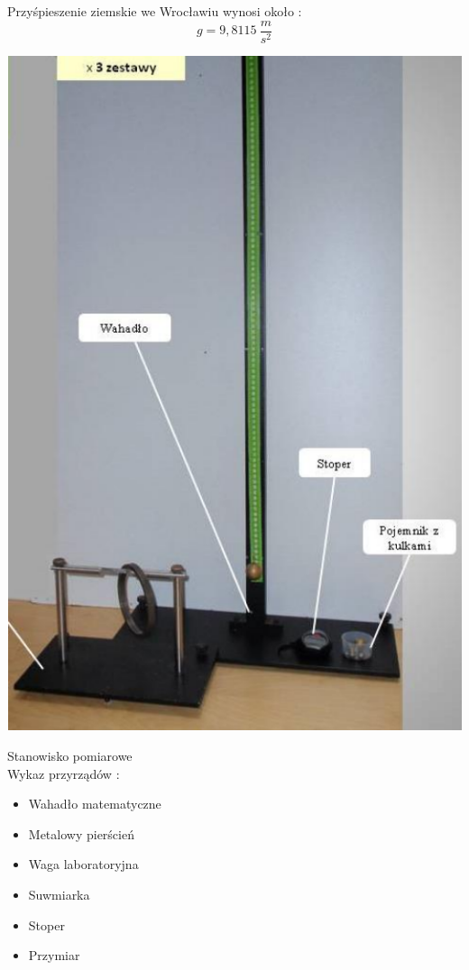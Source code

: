 \documentclass[12pt]{article}
\begin{document}
Przyśpieszenie ziemskie we Wrocławiu wynosi około :
$$ g = 9,8115 \ \frac{m}{s^2} $$

\includegraphics[scale=0.6]{schemat.png}

Stanowisko pomiarowe \\

Wykaz przyrządów : 
\begin{itemize}
    \item Wahadło matematyczne
    \item Metalowy pierścień
    \item Waga laboratoryjna
    \item Suwmiarka
    \item Stoper
    \item Przymiar
\end{itemize}
\end{document}
